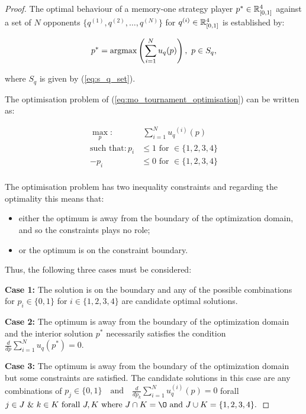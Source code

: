 \begin{proof}
The optimal behaviour of a memory-one strategy player
\(p^* \in \mathbb{R}_{[0, 1]} ^ 4\)
against a set of \(N\) opponents \(\{q^{(1)}, q^{(2)}, \dots, q^{(N)} \}\)
for \(q^{(i)} \in \mathbb{R}_{[0, 1]} ^ 4\) is established by:

\[p^* = \textnormal{argmax}\left(\sum\limits_{i=1} ^ N  u_q(p)\right), \ p \in S_q,\]

where \(S_q\) is given by (\ref{eq:s_q_set}).

The optimisation problem of (\ref{eq:mo_tournament_optimisation}) can be
written as:

\begin{equation}\label{eq:mo_tournament_optimisation_standard}
    \begin{aligned}
    \max_p: & \ \sum_{i=1} ^ {N} {u_q}^{(i)} (p)
    \\
    \text{such that}: p_i & \leq 1 \text{ for } \in \{1, 2, 3, 4\} \\
    - p_i & \leq 0 \text{ for } \in \{1, 2, 3, 4\} \\
    \end{aligned}
\end{equation}

The optimisation problem has two inequality constraints and regarding the optimality
this means that:

\begin{itemize}
    \item either the optimum is away from the boundary of the optimization domain, and so the constraints plays no role;
    \item or the optimum is on the constraint boundary.
\end{itemize}

Thus, the following three cases must be considered:

\textbf{Case 1:} The solution is on the boundary and any of the possible
combinations for $p_i \in \{0, 1\}$ for $i \in \{1, 2, 3, 4\}$ are candidate
optimal solutions.

\textbf{Case 2:} The optimum is away from the boundary of the optimization domain
and the interior solution $p^*$ necessarily satisfies the condition
\(\frac{d}{dp} \sum\limits_{i=1} ^ N  u_q(p^*) = 0\).

\textbf{Case 3:} The optimum is away from the boundary of the optimization domain
but some constraints are satisfied. The candidate solutions in this case
are any combinations of $p_j \in \{0, 1\} \quad \text{and} \quad \frac{d}{dp_k} 
\sum\limits_{i=1} ^ N  u_q^{(i)}(p) = 0$ 
forall $ j \in J \text{ \& } k \in K \text{ forall } J, K
\text{ where } J \cap K = \O \text{ and } J \cup K = \{1, 2, 3, 4\}.$


\end{proof}
